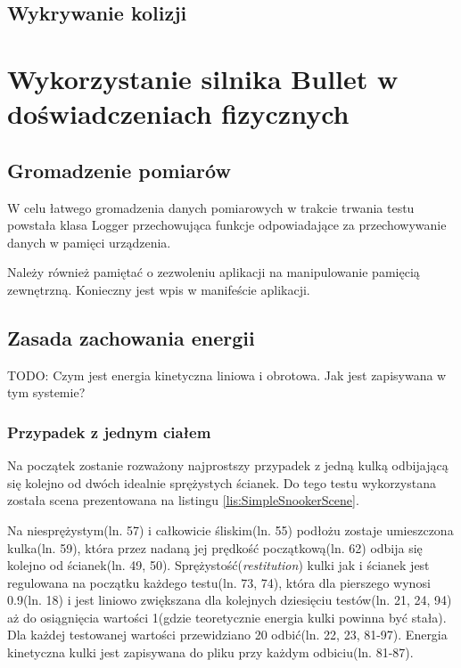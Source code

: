 \subsection{Wykrywanie kolizji}

\section{Wykorzystanie silnika Bullet w doświadczeniach fizycznych}

\subsection{Gromadzenie pomiarów}

W celu łatwego gromadzenia danych pomiarowych w trakcie trwania testu powstała
klasa Logger przechowująca funkcje odpowiadające za przechowywanie danych w
pamięci urządzenia.
  
Należy również pamiętać o zezwoleniu aplikacji na manipulowanie pamięcią
zewnętrzną. Konieczny jest wpis w manifeście aplikacji.


\subsection{Zasada zachowania energii}

TODO: Czym jest energia kinetyczna liniowa i obrotowa. Jak jest zapisywana w tym
systemie?

\subsubsection{Przypadek z jednym ciałem}
Na początek zostanie rozważony najprostszy przypadek z jedną kulką odbijającą
się kolejno od dwóch idealnie sprężystych ścianek. Do tego testu wykorzystana
została scena prezentowana na listingu \ref{lis:SimpleSnookerScene}.
 
Na niesprężystym(ln. 57) i całkowicie śliskim(ln. 55) podłożu zostaje
umieszczona kulka(ln. 59), która przez nadaną jej prędkość początkową(ln. 62)
odbija się kolejno od ścianek(ln. 49, 50). Sprężystość(\emph{restitution}) kulki jak i ścianek jest regulowana na
początku każdego testu(ln. 73, 74), która dla pierszego wynosi 0.9(ln. 18) i
jest liniowo zwiększana dla kolejnych dziesięciu testów(ln. 21, 24, 94) aż do
osiągnięcia wartości 1(gdzie teoretycznie energia kulki powinna być stała).
Dla każdej testowanej wartości przewidziano 20 odbić(ln. 22, 23, 81-97). Energia
kinetyczna kulki jest zapisywana do pliku przy każdym odbiciu(ln. 81-87).

